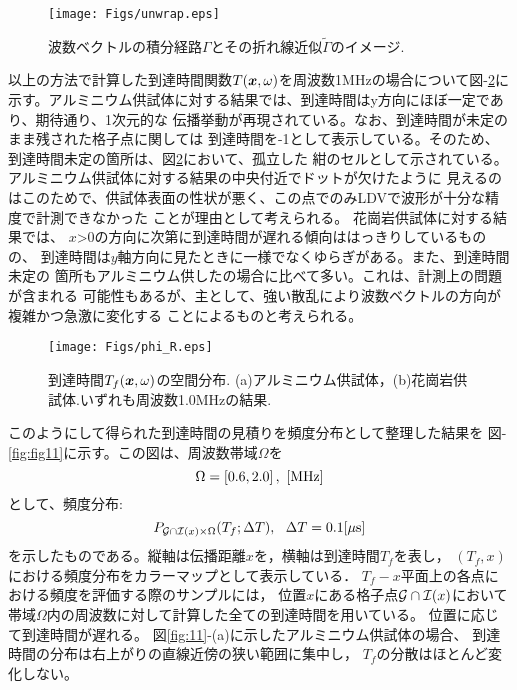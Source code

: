 \begin{figure}
\begin{center}
	\texttt{[image: Figs/unwrap.eps]}
	\caption{波数ベクトルの積分経路$\Gamma$とその折れ線近似$\tilde \Gamma$のイメージ.}
	\label{fig:fig12}
\end{center}
\end{figure}
以上の方法で計算した到達時間関数$T(\mbox{\boldmath{$x$}},\omega)$を周波数1MHzの場合について図-\ref{fig:fig10}に
示す。アルミニウム供試体に対する結果では、到達時間はy方向にほぼ一定であり、期待通り、1次元的な
伝播挙動が再現されている。なお、到達時間が未定のまま残された格子点に関しては
到達時間を-1として表示している。そのため、到達時間未定の箇所は、図\ref{fig:fig10}において、孤立した
紺のセルとして示されている。アルミニウム供試体に対する結果の中央付近でドットが欠けたように
見えるのはこのためで、供試体表面の性状が悪く、この点でのみLDVで波形が十分な精度で計測できなかった
ことが理由として考えられる。
花崗岩供試体に対する結果では、
$x$>0の方向に次第に到達時間が遅れる傾向ははっきりしているものの、
到達時間は$y$軸方向に見たときに一様でなくゆらぎがある。また、到達時間未定の
箇所もアルミニウム供したの場合に比べて多い。これは、計測上の問題が含まれる
可能性もあるが、主として、強い散乱により波数ベクトルの方向が複雑かつ急激に変化する
ことによるものと考えられる。
\begin{figure}
\begin{center}
	\texttt{[image: Figs/phi\_R.eps]}
	\caption{到達時間$T_f(\mbox{\boldmath{$x$}},\omega)$の空間分布. 
	(a)アルミニウム供試体，(b)花崗岩供試体.いずれも周波数1.0MHzの結果.}
	\label{fig:fig10}
\end{center}
\end{figure}
このようにして得られた到達時間の見積りを頻度分布として整理した結果を
図-\ref{fig:fig11}に示す。この図は、周波数帯域$\Omega$を
\[
	\Omega = \left[ 0.6, 2.0\right],\,\, [{\rm MHz}]
\]
として、頻度分布:
\begin{equation}
	P_{{\cal G \cap I}(x)\times \Omega }(T_f; \Delta T), \ \ \Delta T=0.1[\mu {\rm s}]
	\label{eqn:P_GIO}
\end{equation}
を示したものである。縦軸は伝播距離$x$を，横軸は到達時間$T_f$を表し，
$(T_f,x)$における頻度分布をカラーマップとして表示している．
$T_f-x$平面上の各点における頻度を評価する際のサンプルには，
位置$x$にある格子点${\cal G \cap I}(x)$において
帯域$\Omega$内の周波数に対して計算した全ての到達時間を用いている。
位置に応じて到達時間が遅れる。
図\ref{fig:11}-(a)に示したアルミニウム供試体の場合、
到達時間の分布は右上がりの直線近傍の狭い範囲に集中し，
$T_f$の分散はほとんど変化しない。
